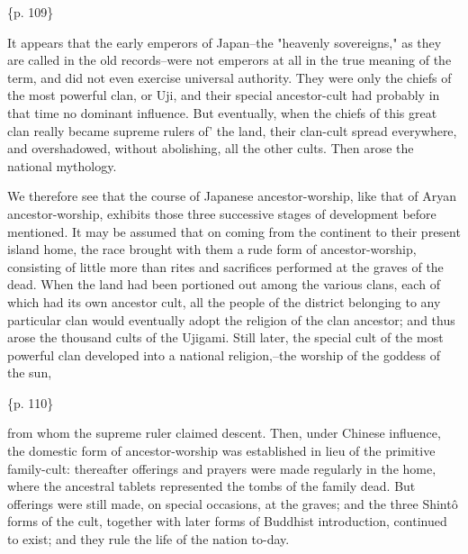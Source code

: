 \{p. 109\}

It appears that the early emperors of Japan--the "heavenly sovereigns," as they are called in the old records--were not emperors at all in the true meaning of the term, and did not even exercise universal authority. They were only the chiefs of the most powerful clan, or Uji, and their special ancestor-cult had probably in that time no dominant influence. But eventually, when the chiefs of this great clan really became supreme rulers of' the land, their clan-cult spread everywhere, and overshadowed, without abolishing, all the other cults. Then arose the national mythology.



We therefore see that the course of Japanese ancestor-worship, like that of Aryan ancestor-worship, exhibits those three successive stages of development before mentioned. It may be assumed that on coming from the continent to their present island home, the race brought with them a rude form of ancestor-worship, consisting of little more than rites and sacrifices performed at the graves of the dead. When the land had been portioned out among the various clans, each of which had its own ancestor cult, all the people of the district belonging to any particular clan would eventually adopt the religion of the clan ancestor; and thus arose the thousand cults of the Ujigami. Still later, the special cult of the most powerful clan developed into a national religion,--the worship of the goddess of the sun,

\{p. 110\}

from whom the supreme ruler claimed descent. Then, under Chinese influence, the domestic form of ancestor-worship was established in lieu of the primitive family-cult: thereafter offerings and prayers were made regularly in the home, where the ancestral tablets represented the tombs of the family dead. But offerings were still made, on special occasions, at the graves; and the three Shintô forms of the cult, together with later forms of Buddhist introduction, continued to exist; and they rule the life of the nation to-day.



